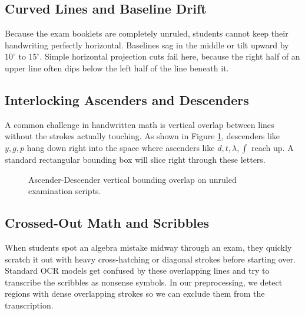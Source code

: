 \subsection{Curved Lines and Baseline Drift}
Because the exam booklets are completely unruled, students cannot keep their handwriting perfectly horizontal. Baselines sag in the middle or tilt upward by $10^\circ$ to $15^\circ$. Simple horizontal projection cuts fail here, because the right half of an upper line often dips below the left half of the line beneath it.

\subsection{Interlocking Ascenders and Descenders}
A common challenge in handwritten math is vertical overlap between lines without the strokes actually touching. As shown in Figure \ref{fig:ascender_descender}, descenders like $y, g, p$ hang down right into the space where ascenders like $d, t, \lambda, \int$ reach up. A standard rectangular bounding box will slice right through these letters.

\begin{figure}[htbp]
\centering
{}
\caption{Ascender-Descender vertical bounding overlap on unruled examination scripts.}
\label{fig:ascender_descender}
\end{figure}

\subsection{Crossed-Out Math and Scribbles}
When students spot an algebra mistake midway through an exam, they quickly scratch it out with heavy cross-hatching or diagonal strokes before starting over. Standard OCR models get confused by these overlapping lines and try to transcribe the scribbles as nonsense symbols. In our preprocessing, we detect regions with dense overlapping strokes so we can exclude them from the transcription.

